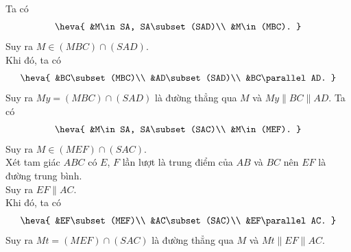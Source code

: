 \begin{ex}
{\begin{itemchoice}
			\itemch  Ta có
			 \[\heva{
			&M\in  SA, SA\subset(SAD)\\
			 &M\in(MBC).
			}\] 
			Suy ra  $M\in(MBC)\cap(SAD)$.\\
			Khi đó,  ta có
			 \[\heva{
			&BC\subset(MBC)\\ 
			 &AD\subset(SAD)\\
			&BC\parallel AD. 
			 }\]
			Suy ra $My=(MBC)\cap(SAD)$ là đường thẳng qua $M$ và  $My\parallel BC\parallel AD$.
			\itemch Ta có 
			\[\heva{ 
			&M\in SA,  SA\subset(SAC)\\
			 &M\in(MEF).
			}\] 
			Suy ra $M\in(MEF)\cap(SAC)$.\\ 
			Xét tam giác $ABC$ có $E$, $F$ lần lượt là trung điểm của $AB$  và $BC$ nên $EF$ là đường trung bình.\\
			 Suy ra $EF\parallel AC$.\\
			Khi đó, ta  có
			\[\heva{ 
			 &EF\subset(MEF)\\
			 &AC\subset(SAC)\\
			 &EF\parallel AC.
			 }\]
			Suy ra $Mt=(MEF)\cap(SAC)$ là đường thẳng qua $M$ và  $Mt\parallel EF\parallel AC$.
		\end{itemchoice}
	} 
\end{ex}

